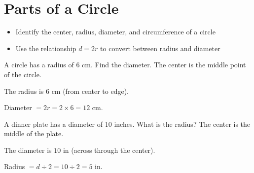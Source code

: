 \section{Parts of a Circle}

\begin{stepGoal}
\begin{itemize}
    \item Identify the center, radius, diameter, and circumference of a circle
    \item Use the relationship $d = 2r$ to convert between radius and diameter
\end{itemize}
\end{stepGoal}

\begin{stepVocabBox}
\end{stepVocabBox}

\begin{stepsCard}
\end{stepsCard}

\begin{stepExample}{A circle has a radius of $6$ cm. Find the diameter.}
     The center is the middle point of the circle.

     The radius is $6$ cm (from center to edge).

     Diameter $= 2r = 2 \times 6 = 12$ cm.
\end{stepExample}

\begin{stepExample}{A dinner plate has a diameter of $10$ inches. What is the radius?}
     The center is the middle of the plate.

     The diameter is $10$ in (across through the center).

     Radius $= d \div 2 = 10 \div 2 = 5$ in.
\end{stepExample}

